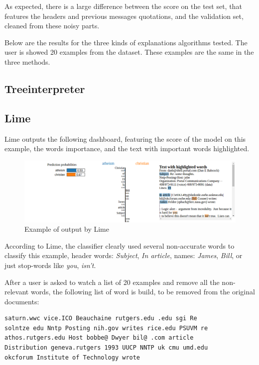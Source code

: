\documentclass[a4paper,11pt]{kth-mag}
\begin{document}
As expected, there is a large difference between the score on the test set, that features the headers and previous messages quotations, and the validation set, cleaned from these noisy parts.

Below are the results for the three kinds of explanations algorithms tested. The user is showed 20 examples from the dataset. These examples are the same in the three methods.

\subsection{Treeinterpreter}

\subsection{Lime}

Lime outputs the following dashboard, featuring the score of the model on this example, the words importance, and the text with important words highlighted.

\begin{figure}[!h]
	\centering
   	\def\svgwidth{\columnwidth}
	\includegraphics[scale=0.35]{lime-output.png}
    \caption{Example of output by Lime}
\end{figure}

According to Lime, the classifier clearly used several non-accurate words to classify this example, header words: \textit{Subject}, \textit{In article}, names: \textit{James}, \textit{Bill}, or just stop-words like \textit{you}, \textit{isn't}.

After a user is asked to watch a list of 20 examples and remove all the non-relevant words, the following list of word is build, to be removed from the original documents:

\begin{center}
\begin{verbatim}
saturn.wwc vice.ICO Beauchaine rutgers.edu .edu sgi Re
solntze edu Nntp Posting nih.gov writes rice.edu PSUVM re
athos.rutgers.edu Host bobbe@ Dwyer bil@ .com article
Distribution geneva.rutgers 1993 UUCP NNTP uk cmu umd.edu
okcforum Institute of Technology wrote
\end{verbatim}
\end{center}
\end{document}

